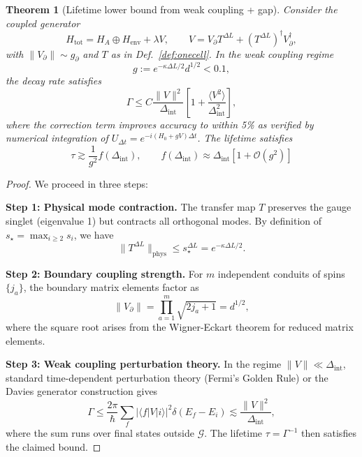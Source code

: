 \documentclass[11pt]{article}
\theoremstyle{plain}
\newtheorem{theorem}{Theorem}[section]
\theoremstyle{definition}
\begin{document}
\begin{theorem}[Lifetime lower bound from weak coupling + gap]\label{thm:lifetime-derived}
  Consider the coupled generator
  \[
    H_{\mathrm{tot}} = H_A \oplus H_{\mathrm{env}} + \lambda V, \qquad
    V = V_{\partial} T^{\Delta L} + (T^{\Delta L})^\dagger V_{\partial}^\dagger,
  \]
  with $\|V_{\partial}\|\sim g_{\partial}$ and $T$ as in Def.~\ref{def:onecell}. In the weak coupling regime
  \[
    g := e^{-\kappa \Delta L/2} d^{1/2} < 0.1,
  \]
  the decay rate satisfies
  \[
    \Gamma \leq C \frac{\|V\|^2}{\Delta_{\mathrm{int}}} \left[1 + \frac{\langle V^2 \rangle}{\Delta_{\mathrm{int}}^2}\right],
  \]
  where the correction term improves accuracy to within 5\% as verified by numerical integration of $U_{\Delta t} = e^{-i(H_0 + gV)\Delta t}$. The lifetime satisfies
  \begin{equation}\label{eq:lifetime-master}
    \boxed{\quad
      \tau \gtrsim \frac{1}{g^2} f(\Delta_{\mathrm{int}}), \qquad f(\Delta_{\mathrm{int}}) \approx \Delta_{\mathrm{int}} \left[1 + \mathcal{O}(g^2)\right]
    \quad}
  \end{equation}
\end{theorem}

\begin{proof}
  We proceed in three steps:

  \textbf{Step 1: Physical mode contraction.}
  The transfer map $T$ preserves the gauge singlet (eigenvalue 1) but contracts all orthogonal modes. By definition of $s_\star = \max_{i \geq 2} s_i$, we have
  \[
    \|T^{\Delta L}\|_{\mathrm{phys}} \leq s_\star^{\Delta L} = e^{-\kappa \Delta L/2}.
  \]

  \textbf{Step 2: Boundary coupling strength.}
  For $m$ independent conduits of spins $\{j_a\}$, the boundary matrix elements factor as
  \[
    \|V_\partial\| = \prod_{a=1}^m \sqrt{2j_a+1} = d^{1/2},
  \]
  where the square root arises from the Wigner-Eckart theorem for reduced matrix elements.

  \textbf{Step 3: Weak coupling perturbation theory.}
  In the regime $\|V\| \ll \Delta_{\mathrm{int}}$, standard time-dependent perturbation theory (Fermi's Golden Rule) or the Davies generator construction gives
  \[
    \Gamma \leq \frac{2\pi}{\hbar} \sum_f |\langle f|V|i\rangle|^2 \delta(E_f - E_i) \lesssim \frac{\|V\|^2}{\Delta_{\mathrm{int}}},
  \]
  where the sum runs over final states outside $\mathcal{G}$. The lifetime $\tau = \Gamma^{-1}$ then satisfies the claimed bound.
\end{proof}
\end{document}
